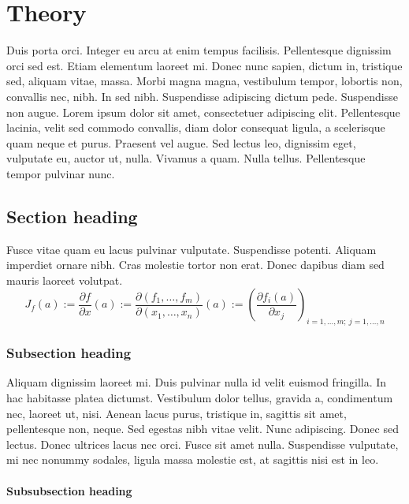 \chapter{Theory}

Duis porta orci. Integer eu arcu at enim tempus facilisis. Pellentesque dignissim orci sed est. Etiam elementum laoreet mi. Donec nunc sapien, dictum in, tristique sed, aliquam vitae, massa. Morbi magna magna, vestibulum tempor, lobortis non, convallis nec, nibh. In sed nibh. Suspendisse adipiscing dictum pede. Suspendisse non augue. Lorem ipsum dolor sit amet, consectetuer adipiscing elit. Pellentesque lacinia, velit sed commodo convallis, diam dolor consequat ligula, a scelerisque quam neque et purus. Praesent vel augue. Sed lectus leo, dignissim eget, vulputate eu, auctor ut, nulla. Vivamus a quam. Nulla tellus. Pellentesque tempor pulvinar nunc.


\section{Section heading}

Fusce vitae quam eu lacus pulvinar vulputate. Suspendisse potenti. Aliquam imperdiet ornare nibh. Cras molestie tortor non erat. Donec dapibus diam sed mauris laoreet volutpat. 
%
\begin{equation}
  J_f(a) := \frac{\partial {f}}{\partial {x}}(a) 
         := \frac{\partial(f_1,  \ldots, f_m)}{\partial(x_1, \ldots, x_n)}(a)
         := \left(\frac{\partial f_i(a)}{\partial x_j}\right)_{i=1,\ldots,m;\
             j=1,\ldots,n}
\end{equation}

\subsection{Subsection heading}

Aliquam dignissim laoreet mi. Duis pulvinar nulla id velit euismod fringilla. In hac habitasse platea dictumst. Vestibulum dolor tellus, gravida a, condimentum nec, laoreet ut, nisi. Aenean lacus purus, tristique in, sagittis sit amet, pellentesque non, neque. Sed egestas nibh vitae velit. Nunc adipiscing. Donec sed lectus. Donec ultrices lacus nec orci. Fusce sit amet nulla. Suspendisse vulputate, mi nec nonummy sodales, ligula massa molestie est, at sagittis nisi est in leo.

\subsubsection{Subsubsection heading}

